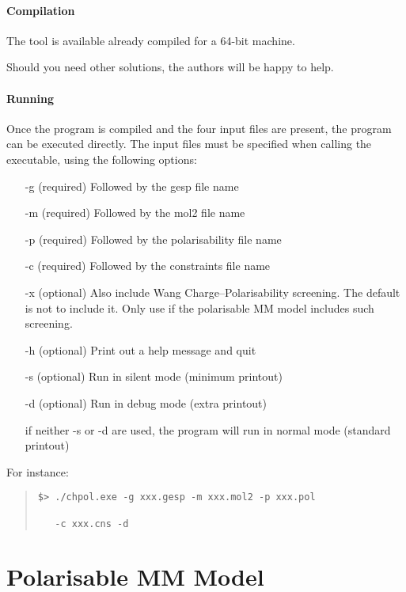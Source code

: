 \documentclass[a4paper]{report}
\begin{document}
\paragraph*{Compilation}

The tool is available already compiled for a 64-bit machine.

Should you need other solutions, the authors will be happy to help.

\paragraph*{Running}

Once the program is compiled and the four input files are present, the program can
be executed directly. The input files must be specified when calling the executable,
using the following options:
\begin{itemize}
\item[-g] (required) Followed by the gesp file name
\item[-m] (required) Followed by the mol2 file name
\item[-p] (required) Followed by the polarisability file name
\item[-c] (required) Followed by the constraints file name
\item[-x] (optional) Also include Wang Charge--Polarisability screening. The default is not to include it. Only use if the polarisable MM model includes such screening.
\item[-h] (optional) Print out a help message and quit
\item[-s] (optional) Run in silent mode (minimum printout)
\item[-d] (optional) Run in debug mode (extra printout)
\item[] if neither -s or -d are used, the program will run in normal mode (standard
printout)
\end{itemize}

For instance:
\begin{framed}
\begin{quote}
\begin{verbatim}
$> ./chpol.exe -g xxx.gesp -m xxx.mol2 -p xxx.pol 

   -c xxx.cns -d
\end{verbatim}
\end{quote}
\end{framed}

\section*{Polarisable MM Model}
\end{document}
